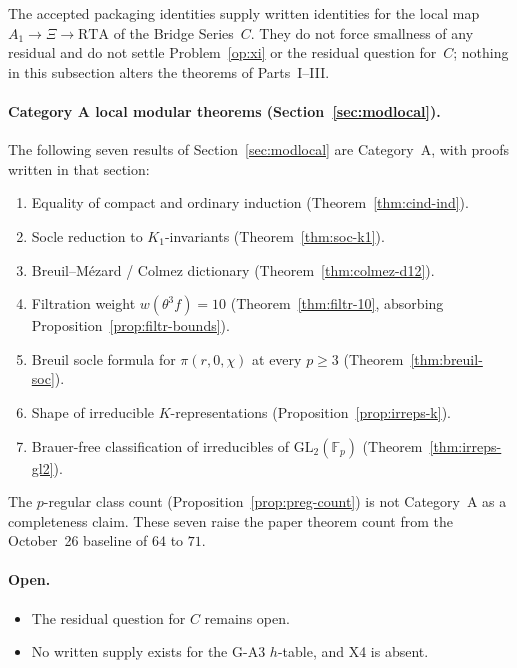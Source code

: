\begin{remark}
The accepted packaging identities supply written identities for the local map $A_1\to\Xi\to\mathrm{RTA}$ of the Bridge Series~$C$. They do not force smallness of any residual and do not settle Problem~\ref{op:xi} or the residual question for~$C$; nothing in this subsection alters the theorems of Parts~I--III.
\end{remark}


\paragraph{Category A local modular theorems (Section~\ref{sec:modlocal}).}
The following seven results of Section~\ref{sec:modlocal} are Category~A, with proofs written in that section:
\begin{enumerate}
\item Equality of compact and ordinary induction (Theorem~\ref{thm:cind-ind}).
\item Socle reduction to $K_1$-invariants (Theorem~\ref{thm:soc-k1}).
\item Breuil--M\'ezard / Colmez dictionary (Theorem~\ref{thm:colmez-d12}).
\item Filtration weight $w(\theta^3 f)=10$ (Theorem~\ref{thm:filtr-10}, absorbing Proposition~\ref{prop:filtr-bounds}).
\item Breuil socle formula for $\pi(r,0,\chi)$ at every $p\ge3$ (Theorem~\ref{thm:breuil-soc}).
\item Shape of irreducible $K$-representations (Proposition~\ref{prop:irreps-k}).
\item Brauer-free classification of irreducibles of $\mathrm{GL}_2(\mathbb{F}_p)$ (Theorem~\ref{thm:irreps-gl2}).
\end{enumerate}
The $p$-regular class count (Proposition~\ref{prop:preg-count}) is not Category~A as a completeness claim. These seven raise the paper theorem count from the October~26 baseline of $64$ to $71$.
\paragraph{Open.}
\begin{itemize}
\item The residual question for $C$ remains open.
\item No written supply exists for the G-A3 $h$-table, and X4 is absent.
\end{itemize}
